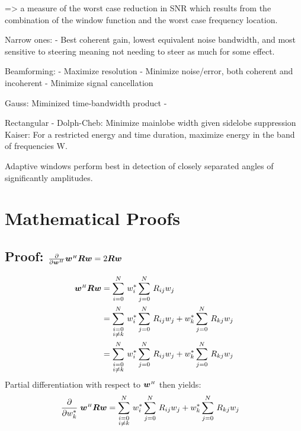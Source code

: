 => a measure of the worst case reduction in SNR which results from the combination of the window function and the worst case frequency location.


Narrow ones:
- Best coherent gain, lowest equivalent noise bandwidth, and most sensitive to steering meaning not needing to steer as much for some effect.


Beamforming:
- Maximize resolution
- Minimize noise/error, both coherent and incoherent
- Minimize signal cancellation

Gauss: Miminized time-bandwidth product
  - 
  
Rectangular
  - 
Dolph-Cheb: Minimize mainlobe width given sidelobe suppression
Kaiser: For a restricted energy and time duration, maximize energy in the band of frequencies W.

Adaptive windows perform best in detection of closely separated angles of significantly amplitudes.


\section{Mathematical Proofs}

\subsection[Proof d/dw\^{}H w\^{}HRw = 2Rw]{Proof: $\frac{\partial}{\partial\boldsymbol{w}^{\scriptscriptstyle H}} \boldsymbol{w}^{\scriptscriptstyle H}\boldsymbol{R}\boldsymbol{w} = 2\boldsymbol{R}\boldsymbol{w}$}

\begin{align}
\boldsymbol{w}^{\scriptscriptstyle H}\boldsymbol{R}\boldsymbol{w} &= \sum\limits_{i=0}^{N}\,w_i^* \sum\limits_{j=0}^{N}\,  R_{ij} w_j \\
&= \sum\limits_{\substack{i=0\\i\ne k}}^{N}\, w_i^* \sum\limits_{j=0}^{N}\, R_{ij} w_j + w_k^*\sum\limits_{j=0}^{N}\, R_{kj} w_j \\
&= \sum\limits_{\substack{i=0\\i\ne k}}^{N}\, w_i^* \sum\limits_{j=0}^{N}\, R_{ij} w_j + w_k^*\sum\limits_{j=0}^{N}\, R_{kj} w_j
\end{align}
%
Partial differentiation with respect to $\boldsymbol{w}^{\scriptscriptstyle H}$ then yields:
%
\begin{align}
\frac{\partial}{\partial w_k^*}\;\boldsymbol{w}^{\scriptscriptstyle H}\boldsymbol{R}\boldsymbol{w}
&= \sum\limits_{\substack{i=0\\i\ne k}}^{N}\, w_i^* \sum\limits_{j=0}^{N}\, R_{ij} w_j + w_k^*\sum\limits_{j=0}^{N}\, R_{kj} w_j
\end{align}
